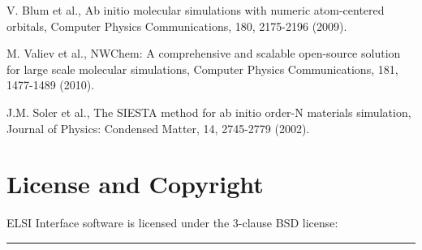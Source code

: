 \documentclass{report}
\begin{document}
\begin{thebibliography}{9}
V. Blum et al., Ab initio molecular simulations with numeric atom-centered orbitals, Computer Physics Communications, 180, 2175-2196 (2009).

M. Valiev et al., NWChem: A comprehensive and scalable open-source solution for large scale molecular simulations, Computer Physics Communications, 181, 1477-1489 (2010).

J.M. Soler et al., The SIESTA method for ab initio order-N materials simulation, Journal of Physics: Condensed Matter, 14, 2745-2779 (2002).



\end{thebibliography}

\chapter*{License and Copyright}
ELSI Interface software is licensed under the 3-clause BSD license:\\
\bigskip

\noindent\rule{18cm}{0.4pt}
\bigskip
\end{document}
